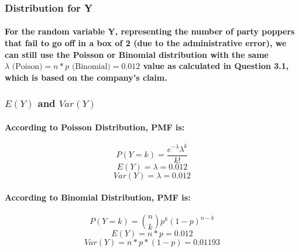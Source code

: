 \subsubsection{Distribution for Y}
\paragraph{For the random variable Y, representing the number of party poppers that fail to go off in a box of 2 (due to the administrative error), we can still use the Poisson or Binomial distribution with the same $\lambda \text{ (Poison)}=n*p \text{ (Binomial)}=0.012$ value as calculated in Question 3.1, which is based on the company's claim.}

\subsubsection{$E(Y)$ and $Var(Y)$}
\paragraph{According to Poisson Distribution, PMF is:}
$$ P(Y=k)=\frac{e^{- \lambda} \lambda^k}{k!} $$
$$ E(Y)= \lambda =0.012 $$
$$ Var(Y) = \lambda=0.012 $$
\paragraph{According to Binomial Distribution, PMF is:}
$$ P(Y=k)= \binom{n}{k} p^k (1 - p)^{n - k}$$
$$ E(Y)= n*p =0.012 $$
$$ Var(Y) =n*p*(1-p)=0.01193 $$